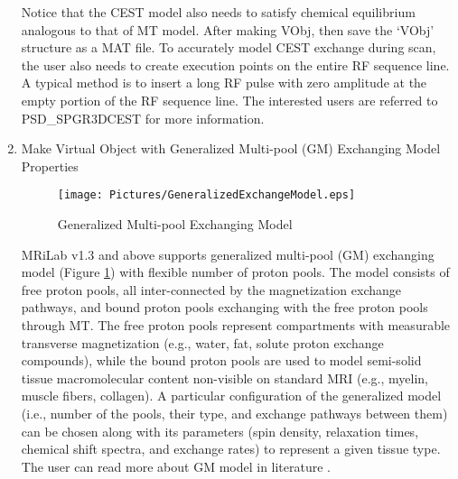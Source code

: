 \documentclass{book}%
\begin{document}
\begin{enumerate}
Notice that the CEST model also needs to satisfy chemical equilibrium analogous to that of MT model. After making VObj, then save the `VObj' structure as a MAT file. To accurately model CEST exchange during scan, the user also needs to create execution points on the entire RF sequence line. A typical method is to insert a long RF pulse with zero amplitude at the empty portion of the RF sequence line. The interested users are referred to PSD\_SPGR3DCEST for more information.


\item Make Virtual Object with Generalized Multi-pool (GM) Exchanging Model Properties\\

\begin{figure}[htbp]
	\centering
		\texttt{[image: Pictures/GeneralizedExchangeModel.eps]}
	\caption{Generalized Multi-pool Exchanging Model}
	\label{fig:GeneralizedExchangeModel}
\end{figure}

MRiLab v1.3 and above supports generalized multi-pool (GM) exchanging model (Figure \ref{fig:GeneralizedExchangeModel}) with flexible number of proton pools. The model consists of free proton pools, all inter-connected by the magnetization exchange pathways, and bound proton pools exchanging with the free proton pools through MT. The free proton pools represent compartments with measurable transverse magnetization (e.g., water, fat, solute proton exchange compounds), while the bound proton pools are used to model semi-solid tissue macromolecular content non-visible on standard MRI (e.g., myelin, muscle fibers, collagen). A particular configuration of the generalized model (i.e., number of the pools, their type, and exchange pathways between them) can be chosen along with its parameters (spin density, relaxation times, chemical shift spectra, and exchange rates) to represent a given tissue type. The user can read more about GM model in literature \cite{Liu2016}.


\end{enumerate}
\end{document}
